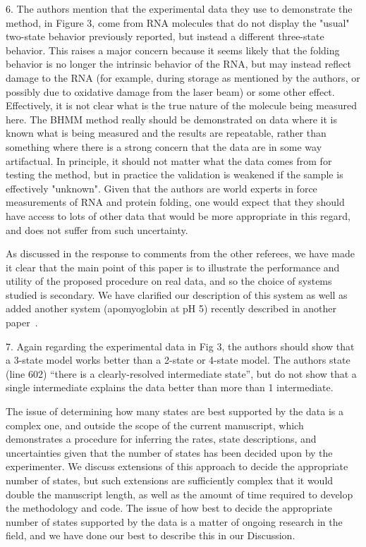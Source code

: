 \documentclass[ucb,qb3,10pt,fullfrom]{ucletter}
\begin{document}
\begin{letter}{}
\color{red}
6. The authors mention that the experimental data they use to demonstrate the method, in Figure 3, come from RNA molecules that do not display the "usual" two-state behavior previously reported, but instead a different three-state behavior. This raises a major concern because it seems likely that the folding behavior is no longer the intrinsic behavior of the RNA, but may instead reflect damage to the RNA (for example, during storage as mentioned by the authors, or possibly due to oxidative damage from the laser beam) or some other effect. Effectively, it is not clear what is the true nature of the molecule being measured here. The BHMM method really should be demonstrated on data where it is known what is being measured and the results are repeatable, rather than something where there is a strong concern that the data are in some way artifactual. In principle, it should not matter what the data comes from for testing the method, but in practice the validation is weakened if
the sample is effectively "unknown".
Given that the authors are world experts in force measurements of RNA and protein folding, one would expect that they should have access to lots of other data that would be more appropriate in this regard, and does not suffer from such uncertainty.
\color{black}

As discussed in the response to comments from the other referees, we have made it clear that the main point of this paper is to illustrate the performance and utility of the proposed procedure on real data, and so the choice of systems studied is secondary.
We have clarified our description of this system as well as added another system (apomyoglobin at pH 5) recently described in another paper~\cite{elms:pnas:2012:apo-myoglobin}. 

\color{red}
7. Again regarding the experimental data in Fig 3, the authors should show that a 3-state model works better than a 2-state or 4-state model. The authors state (line 602) ``there is a clearly-resolved intermediate state'', but do not show that a single intermediate explains the data better than more than 1 intermediate.
\color{black}

The issue of determining how many states are best supported by the data is a complex one, and outside the scope of the current manuscript, which demonstrates a procedure for inferring the rates, state descriptions, and uncertainties given that the number of states has been decided upon by the experimenter.  
We discuss extensions of this approach to decide the appropriate number of states, but such extensions are sufficiently complex that it would double the manuscript length, as well as the amount of time required to develop the methodology and code. 
The issue of how best to decide the appropriate number of states supported by the data is a matter of ongoing research in the field, and we have done our best to describe this in our Discussion.


\end{letter}
\end{document}
